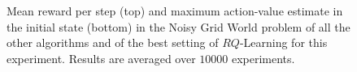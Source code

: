 \begin{figure}[t]
\begin{minipage}{\columnwidth}
\end{minipage}
  \caption[Noisy Grid World algorithms comparison]{Mean reward per step (top) and maximum action-value estimate in the initial state (bottom) in the Noisy Grid World problem of all the other algorithms and of the best setting of $RQ$-Learning for this experiment. Results are averaged over $10000$ experiments.}
  \label{F:hasselt_all}
\end{figure}
\begin{figure}[t]
\begin{minipage}{\columnwidth}
\centering

\end{minipage}
\end{figure}
